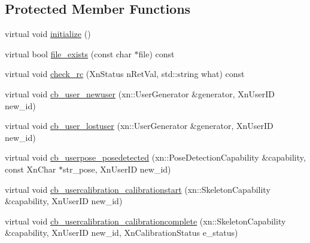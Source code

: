 \subsection*{Protected Member Functions}
\begin{DoxyCompactItemize}
\item 
virtual void \hyperlink{classmae_1_1nite_1_1nite__controller_ae2c0271071c7395e21e16930e8b0f950}{initialize} ()
\item 
virtual bool \hyperlink{classmae_1_1nite_1_1nite__controller_a7b7f0f0a36813a535383d27638501a53}{file\-\_\-exists} (const char $\ast$file) const 
\item 
virtual void \hyperlink{classmae_1_1nite_1_1nite__controller_a33ad327be42da78a9fbf86bc85c970df}{check\-\_\-rc} (Xn\-Status n\-Ret\-Val, std\-::string what) const 
\item 
virtual void \hyperlink{classmae_1_1nite_1_1nite__controller_ab1d1249250dbff675ef6719d0651faf8}{cb\-\_\-user\-\_\-newuser} (xn\-::\-User\-Generator \&generator, Xn\-User\-I\-D new\-\_\-id)
\item 
virtual void \hyperlink{classmae_1_1nite_1_1nite__controller_a7bb1d6eb721bba6dae8d679cff75e2e5}{cb\-\_\-user\-\_\-lostuser} (xn\-::\-User\-Generator \&generator, Xn\-User\-I\-D new\-\_\-id)
\item 
virtual void \hyperlink{classmae_1_1nite_1_1nite__controller_a42d55d1d4c2094df70f4bd38944f73f5}{cb\-\_\-userpose\-\_\-posedetected} (xn\-::\-Pose\-Detection\-Capability \&capability, const Xn\-Char $\ast$str\-\_\-pose, Xn\-User\-I\-D new\-\_\-id)
\item 
virtual void \hyperlink{classmae_1_1nite_1_1nite__controller_a280e375f7105a9ab072a23c3ba14ad54}{cb\-\_\-usercalibration\-\_\-calibrationstart} (xn\-::\-Skeleton\-Capability \&capability, Xn\-User\-I\-D new\-\_\-id)
\item 
virtual void \hyperlink{classmae_1_1nite_1_1nite__controller_ac9b7019cbe960bd9ddd2f7a3479442ac}{cb\-\_\-usercalibration\-\_\-calibrationcomplete} (xn\-::\-Skeleton\-Capability \&capability, Xn\-User\-I\-D new\-\_\-id, Xn\-Calibration\-Status e\-\_\-status)
\end{DoxyCompactItemize}


